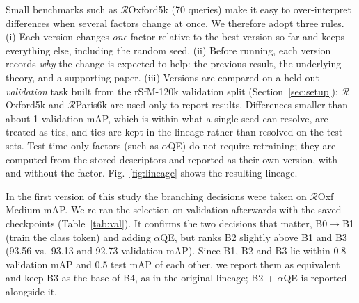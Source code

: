 \documentclass[runningheads]{llncs}
\newcommand{\roxf}{$\mathcal{R}$Oxford5k}
\newcommand{\rpar}{$\mathcal{R}$Paris6k}
\newcommand{\roxs}{$\mathcal{R}$Oxf}
\newcommand{\aqe}{$\alpha$QE}
\begin{document}
Small benchmarks such as \roxf{} (70 queries) make it easy to over-interpret
differences when several factors change at once. We therefore adopt three
rules. (i) Each version changes \emph{one} factor relative to the best version
so far and keeps everything else, including the random seed. (ii) Before
running, each version records \emph{why} the change is expected to help: the
previous result, the underlying theory, and a supporting paper. (iii) Versions
are compared on a held-out \emph{validation} task built from the rSfM-120k
validation split (Section~\ref{sec:setup}); \roxf{} and \rpar{} are used only
to report results. Differences smaller than about 1 validation mAP, which is
within what a single seed can resolve, are treated as ties, and ties are kept
in the lineage rather than resolved on the test sets. Test-time-only factors
(such as \aqe{}) do not require retraining; they are computed from the stored
descriptors and reported as their own version, with and without the factor.
Fig.~\ref{fig:lineage} shows the resulting lineage.

In the first version of this study the branching decisions were taken on
\roxs{} Medium mAP. We re-ran the selection on validation afterwards with the
saved checkpoints (Table~\ref{tab:val}). It confirms the two decisions that
matter, B0$\rightarrow$B1 (train the class token) and adding \aqe{}, but ranks
B2 slightly above B1 and B3 (93.56 vs.\ 93.13 and 92.73 validation mAP). Since
B1, B2 and B3 lie within 0.8 validation mAP and 0.5 test mAP of each other, we
report them as equivalent and keep B3 as the base of B4, as in the original
lineage; B2 + \aqe{} is reported alongside it.
\end{document}
